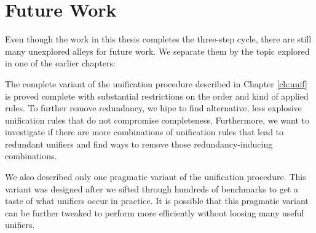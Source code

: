 


\section*{Future Work}

Even though the work in this thesis completes the three-step cycle, there are
still many unexplored alleys for future work. We separate them by the topic
explored in one of the earlier chapters:

 The complete variant of the unification procedure
described in Chapter \ref{ch:unif} is proved complete with substantial
restrictions on the order and kind of applied rules. To further
remove redundancy, we hipe to find alternative, less explosive unification rules
that do not compromise completeness. Furthermore, we want to investigate if
there are more combinations of unification rules that lead to redundant unifiers
and find ways to remove those redundancy-inducing combinations.

We also described only one pragmatic variant of the unification procedure. This
variant was designed after we sifted through hundreds of benchmarks to get a
taste of what unifiers occur in practice. It is possible that this pragmatic variant
can be further tweaked to perform more efficiently without loosing many useful unifiers.

